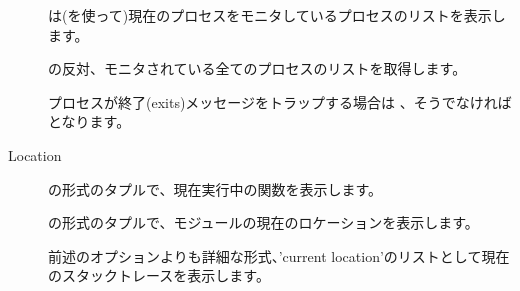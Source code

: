 \begin{description*}
\begin{description}
			\item[] は(を使って)現在のプロセスをモニタしているプロセスのリストを表示します。

			\item[] の反対、モニタされている全てのプロセスのリストを取得します。

			\item[] プロセスが終了(exits)メッセージをトラップする場合は  、そうでなければ  となります。

		\end{description}		
	\item[Location] \hfill
		\begin{description}
			\item[] の形式のタプルで、現在実行中の関数を表示します。

			\item[] の形式のタプルで、モジュールの現在のロケーションを表示します。

			\item[] 前述のオプションよりも詳細な形式、'current location'のリストとして現在のスタックトレースを表示します。


\end{description}
\end{description*}
